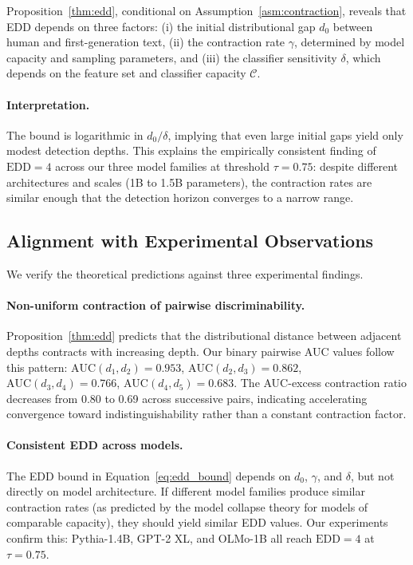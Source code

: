 Proposition~\ref{thm:edd}, conditional on Assumption~\ref{asm:contraction}, reveals that EDD depends on three factors: (i) the initial distributional gap $d_0$ between human and first-generation text, (ii) the contraction rate $\gamma$, determined by model capacity and sampling parameters, and (iii) the classifier sensitivity $\delta$, which depends on the feature set and classifier capacity $\mathcal{C}$.

\paragraph{Interpretation.} The bound is logarithmic in $d_0/\delta$, implying that even large initial gaps yield only modest detection depths. This explains the empirically consistent finding of $\text{EDD} = 4$ across our three model families at threshold $\tau = 0.75$: despite different architectures and scales (1B to 1.5B parameters), the contraction rates are similar enough that the detection horizon converges to a narrow range.

\subsection{Alignment with Experimental Observations}
\label{sec:theory:validation}

We verify the theoretical predictions against three experimental findings.

\paragraph{Non-uniform contraction of pairwise discriminability.}
Proposition~\ref{thm:edd} predicts that the distributional distance between adjacent depths contracts with increasing depth. Our binary pairwise AUC values follow this pattern: $\text{AUC}(d_1, d_2) = 0.953$, $\text{AUC}(d_2, d_3) = 0.862$, $\text{AUC}(d_3, d_4) = 0.766$, $\text{AUC}(d_4, d_5) = 0.683$. The AUC-excess contraction ratio decreases from 0.80 to 0.69 across successive pairs, indicating accelerating convergence toward indistinguishability rather than a constant contraction factor.

\paragraph{Consistent EDD across models.}
The EDD bound in Equation~\eqref{eq:edd_bound} depends on $d_0$, $\gamma$, and $\delta$, but not directly on model architecture. If different model families produce similar contraction rates (as predicted by the model collapse theory for models of comparable capacity), they should yield similar EDD values. Our experiments confirm this: Pythia-1.4B, GPT-2 XL, and OLMo-1B all reach $\text{EDD} = 4$ at $\tau = 0.75$.

